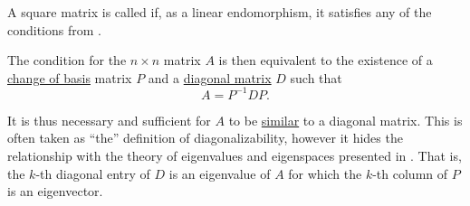 \begin{definition}\label{def:diagonalizable_matrix}\mimprovised
  A square matrix is called  if, as a linear endomorphism, it satisfies any of the conditions from .

  The condition  for the \( n \times n \) matrix \( A \) is then equivalent to the existence of a \hyperref[con:change_of_basis]{change of basis} matrix \( P \) and a \hyperref[def:matrix_diagonal]{diagonal matrix} \( D \) such that
  \begin{equation*}
    A = P^{-1} D P.
  \end{equation*}

  It is thus necessary and sufficient for \( A \) to be \hyperref[def:similar_matrices]{similar} to a diagonal matrix. This is often taken as \enquote{the} definition of diagonalizability, however it hides the relationship with the theory of eigenvalues and eigenspaces presented in . That is, the \( k \)-th diagonal entry of \( D \) is an eigenvalue of \( A \) for which the \( k \)-th column of \( P \) is an eigenvector.
\end{definition}

